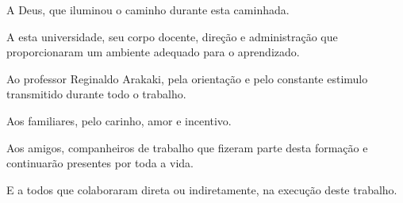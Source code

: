 \documentclass[]{politex}
\begin{document}
\begin{agradecimentos}
A Deus, que iluminou o caminho durante esta caminhada.

A esta universidade, seu corpo docente, direção e administração que proporcionaram um ambiente adequado para o aprendizado.

Ao professor Reginaldo Arakaki, pela orientação e pelo constante estimulo transmitido durante todo o trabalho.

Aos familiares, pelo carinho, amor e incentivo.

Aos amigos, companheiros de trabalho que fizeram parte desta formação e continuarão presentes por toda a vida.

E a todos que colaboraram direta ou indiretamente, na execução deste trabalho.

\end{agradecimentos}



%
\end{document}
